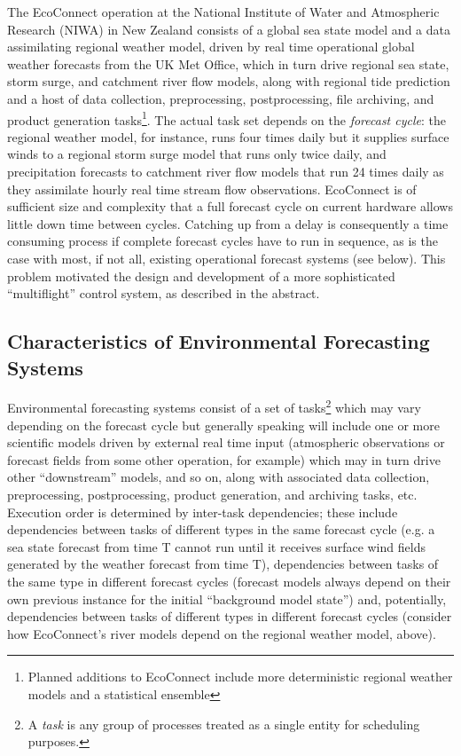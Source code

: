 \documentclass[11pt,a4paper]{article}
\begin{document}
The EcoConnect operation at the National Institute of Water and
Atmospheric Research (NIWA) in New Zealand consists of a global sea
state model and a data assimilating regional weather model, driven by
real time operational global weather forecasts from the UK Met Office,
which in turn drive regional sea state, storm surge, and catchment river
flow models, along with regional tide prediction and a host of data
collection, preprocessing, postprocessing, file archiving, and product
generation tasks\footnote{Planned additions to EcoConnect include more
deterministic regional weather models and a statistical ensemble}.  The
actual task set depends on the {\em forecast cycle}: the regional weather
model, for instance, runs four times daily but it supplies surface winds
to a regional storm surge model that runs only twice daily, and
precipitation forecasts to catchment river flow models that run 24 times
daily as they assimilate hourly real time stream flow observations.
EcoConnect is of sufficient size and complexity that a full forecast
cycle on current hardware allows little down time between cycles.
Catching up from a delay is consequently a time consuming process if
complete forecast cycles have to run in sequence, as is the case with
most, if not all, existing operational forecast systems (see below).
This problem motivated the design and development of a more
sophisticated ``multiflight'' control system, as described in the
abstract.


\subsection{Characteristics of Environmental Forecasting Systems}

Environmental forecasting systems consist of a set of tasks\footnote{A
{\em task} is any group of processes treated as a single entity for
scheduling purposes.} which may vary depending on the forecast cycle but
generally speaking will include one or more scientific models driven by
external real time input (atmospheric observations or forecast fields
from some other operation, for example) which may in turn drive other
``downstream'' models, and so on, along with associated data collection,
preprocessing, postprocessing, product generation, and archiving tasks,
etc.  Execution order is determined by inter-task dependencies; these
include dependencies between tasks of different types in the same
forecast cycle (e.g. a sea state forecast from time T cannot run until
it receives surface wind fields generated by the weather forecast from
time T), dependencies between tasks of the same type in different
forecast cycles (forecast models always depend on their own previous
instance for the initial ``background model state'') and, potentially,
dependencies between tasks of different types in different forecast
cycles (consider how EcoConnect's river models depend on the regional 
weather model, above).
\end{document}
